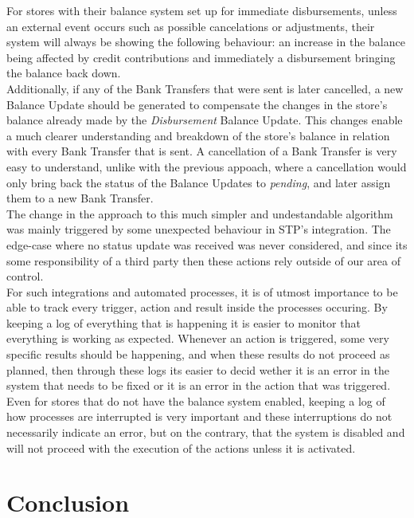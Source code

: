 For stores with their balance system set up for immediate disbursements, unless an external event occurs such as possible cancelations or adjustments, their system will always be showing the following behaviour: an increase in the balance being affected by credit contributions and immediately a disbursement bringing the balance back down.\\


Additionally, if any of the Bank Transfers that were sent is later cancelled, a new Balance Update should be generated to compensate the changes in the store's balance already made by the \textit{Disbursement} Balance Update. This changes enable a much clearer understanding and breakdown of the store's balance in relation with every Bank Transfer that is sent. A cancellation of a Bank Transfer is very easy to understand, unlike with the previous appoach, where a cancellation would only bring back the status of the Balance Updates to \textit{pending}, and later assign them to a new Bank Transfer.\\ 

The change in the approach to this much simpler and undestandable algorithm was mainly triggered by some unexpected behaviour in STP's integration. The edge-case where no status update was received was never considered, and since its some responsibility of a third party then these actions rely outside of our area of control.\\ 

For such integrations and automated processes, it is of utmost importance to be able to track every trigger, action and result inside the processes occuring. By keeping a log of everything that is happening it is easier to monitor that everything is working as expected. Whenever an action is triggered, some very specific results should be happening, and when these results do not proceed as planned, then through these logs its easier to decid wether it is an error in the system that needs to be fixed or it is an error in the action that was triggered. Even for stores that do not have the balance system enabled, keeping  a log of how processes are interrupted is very important and these interruptions do not necessarily indicate an error, but on the contrary, that the system is disabled and will not proceed with the execution of the actions unless it is activated.

\section{Conclusion}

